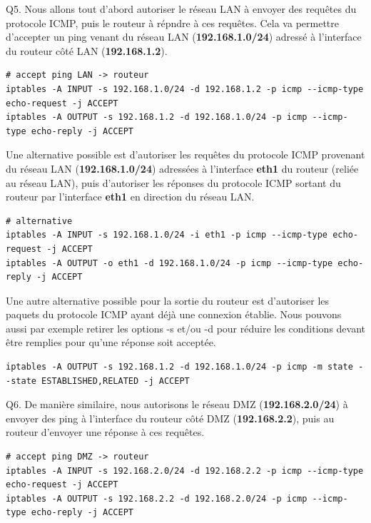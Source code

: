 \documentclass[frenchb, 11pt]{article}
\newlength{\leftbarwidth}
\newlength{\leftbarsep}
\newcommand*{\leftbarcolorcmd}{\color{leftbarcolor}} %
\renewenvironment{leftbar}{%
    \def\FrameCommand{{\leftbarcolorcmd{\vrule width \leftbarwidth\relax\hspace {\leftbarsep}}}}%
    \MakeFramed {\advance \hsize -\width \FrameRestore }%
}{%
    \endMakeFramed
}
\begin{document}
\begin{leftbar}
	\noindent Q5. Nous allons tout d'abord autoriser le réseau LAN à envoyer des requêtes du protocole ICMP, puis le routeur à répndre à ces requêtes. Cela va permettre d'accepter un ping venant du réseau LAN (\textbf{192.168.1.0/24}) adressé à l'interface du routeur côté LAN (\textbf{192.168.1.2}).
	\begin{lstlisting}[numbers=none]
# accept ping LAN -> routeur
iptables -A INPUT -s 192.168.1.0/24 -d 192.168.1.2 -p icmp --icmp-type echo-request -j ACCEPT
iptables -A OUTPUT -s 192.168.1.2 -d 192.168.1.0/24 -p icmp --icmp-type echo-reply -j ACCEPT
	\end{lstlisting}
	\hfill
	
	\noindent Une alternative possible est d'autoriser les requêtes du protocole ICMP provenant du réseau LAN (\textbf{192.168.1.0/24}) adressées à l'interface \textbf{eth1} du routeur (reliée au réseau LAN), puis d'autoriser les réponses du protocole ICMP sortant du routeur par l'interface \textbf{eth1} en direction du réseau LAN.
	\begin{lstlisting}[numbers=none]
# alternative
iptables -A INPUT -s 192.168.1.0/24 -i eth1 -p icmp --icmp-type echo-request -j ACCEPT
iptables -A OUTPUT -o eth1 -d 192.168.1.0/24 -p icmp --icmp-type echo-reply -j ACCEPT
	\end{lstlisting}
	\hfill
	
	\noindent Une autre alternative possible pour la sortie du routeur est d'autoriser les paquets du protocole ICMP ayant déjà une connexion établie. Nous pouvons aussi par exemple retirer les options -s et/ou -d pour réduire les conditions devant être remplies pour qu'une réponse soit acceptée.
	\begin{lstlisting}[numbers=none]
iptables -A OUTPUT -s 192.168.1.2 -d 192.168.1.0/24 -p icmp -m state --state ESTABLISHED,RELATED -j ACCEPT
	\end{lstlisting}
\end{leftbar}

\begin{leftbar}
	\noindent Q6. De manière similaire, nous autorisons le réseau DMZ (\textbf{192.168.2.0/24}) à envoyer des ping à l'interface du routeur côté DMZ (\textbf{192.168.2.2}), puis au routeur d'envoyer une réponse à ces requêtes.
	\begin{lstlisting}[numbers=none]
# accept ping DMZ -> routeur
iptables -A INPUT -s 192.168.2.0/24 -d 192.168.2.2 -p icmp --icmp-type echo-request -j ACCEPT
iptables -A OUTPUT -s 192.168.2.2 -d 192.168.2.0/24 -p icmp --icmp-type echo-reply -j ACCEPT
	\end{lstlisting}
\end{leftbar}
\end{document}
